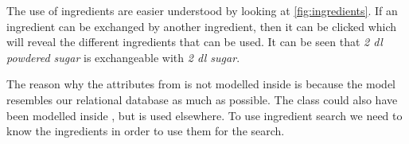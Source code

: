 The use of ingredients are easier understood by looking at \autoref{fig:ingredients}. If an ingredient can be exchanged by another ingredient, then it can be clicked which will reveal the different ingredients that can be used. It can be seen that \textit{2 dl powdered sugar} is exchangeable with \textit{2 dl sugar}.

The reason why the attributes from  is not modelled inside  is because the model resembles our relational database as much as possible. The  class could also have been modelled inside , but  is used elsewhere. To use ingredient search we need to know the ingredients in order to use them for the search.